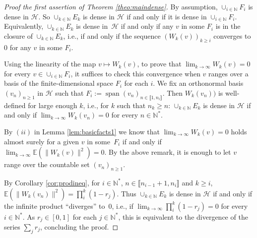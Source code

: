 \documentclass[10pt,a4paper]{article}
\DeclareMathOperator{\psan}{span}
\newcommand{\hilH}{\mathcal H}
\newcommand{\norm}[1]{\lVert #1\rVert}
\newcommand{\nN}{n\in \mathbb{N}}
\newcommand{\kN}{k\in \mathbb{N}}
\newcommand{\jN}{j\in \mathbb{N}}
\newcommand{\iN}{i\in \mathbb{N}}
\newcommand{\intt}[1]{\llbracket #1 \rrbracket}
\newcommand{\expec}[1]{\mathbb{E}\left(#1\right)}
\begin{document}
\begin{proof}[Proof the first assertion of Theorem \ref{theo:maindense}]
By assumption, $\cup_{\iN}F_i$ is dense in $\hilH$. So $\cup_{\kN}E_k$ is dense in $\hilH$ if and only if it is dense in $\cup_{\iN}F_i$. Equivalently, $\cup_{\kN}E_k$ is dense in~$\hilH$ if and only if any $v$ in some $F_i$ is in the closure of $\cup_{\kN}E_k$, i.e., if and only if the sequence $(W_k(v))_{k\geq i}$ converges to $0$ for any $v$ in some $F_i$.

Using the linearity of the map $v\mapsto W_k(v)$, to prove that $\lim_{k\to \infty} W_k(v)=0$ for every $v\in \cup_{\iN}F_i$, it suffices to check this convergence when $v$ ranges over a basis of the finite-dimensional space $F_i$ for each $i$. We fix an orthonormal basis $(v_n)_{n\geq 1}$ in $\hilH$ such that $F_i:=\psan (v_n)_{n\in \intt{1,n_i}}$. Then $W_k(v_n))$ is well-defined for large enough $k$, i.e., for $k$ such that $n_k\geq n$: $\cup_{\kN}E_k$ is dense in $\hilH$ if and only if $\lim_{k \to \infty} W_k(v_n)=0$ for every $\nN^*$.

By $(ii)$ in Lemma \ref{lem:basicfacts1} we know that $\lim_{k\to \infty} W_k(v)=0$ holds almost surely for a given $v$ in some~$F_i$ if and only if $\lim_{k\to \infty} \expec{\norm{W_k(v)}^2}=0$. By the above remark, it is enough to let $v$ range over the countable set $(v_n)_{n\geq 1}$.

By Corollary \ref{cor:prodineq}, for $\iN^*$, $n\in \intt{n_{i-1}+1,n_i}$ and $k\geq i$, $\expec{\norm{W_k(v_n)}^2}= \prod_{i}^{k} (1-r_j)$. Thus $\cup_{\kN}E_k$ is dense in $\hilH$ if and only if the infinite product ``diverges'' to~$0$, i.e., if $\lim_{k\to \infty} \prod_{i}^{k} (1-r_j)\allowbreak=0$ for every $\iN^*$. As $r_j\in [0,1]$ for each $\jN ^*$, this is equivalent to the divergence of the series $\sum_j r_j$, concluding the proof.
\end{proof}
\end{document}
